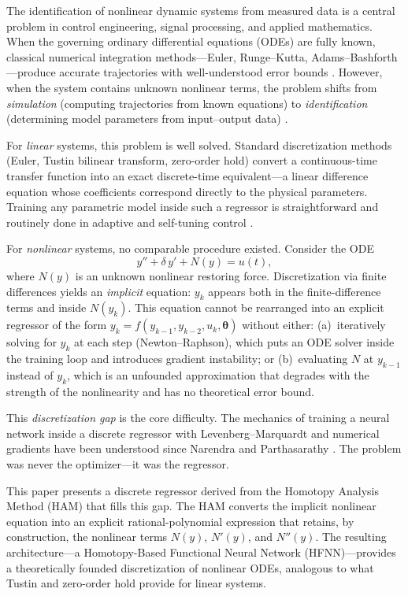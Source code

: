 \documentclass[preprint,12pt]{elsarticle}
\begin{document}
The identification of nonlinear dynamic systems from measured data is a central problem in control engineering, signal processing, and applied mathematics. When the governing ordinary differential equations (ODEs) are fully known, classical numerical integration methods---Euler, Runge--Kutta, Adams--Bashforth---produce accurate trajectories with well-understood error bounds \cite{butcher2016, hairer1993}. However, when the system contains unknown nonlinear terms, the problem shifts from \emph{simulation} (computing trajectories from known equations) to \emph{identification} (determining model parameters from input--output data) \cite{ljung1987}.

For \emph{linear} systems, this problem is well solved. Standard discretization methods (Euler, Tustin bilinear transform, zero-order hold) convert a continuous-time transfer function into an exact discrete-time equivalent---a linear difference equation whose coefficients correspond directly to the physical parameters. Training any parametric model inside such a regressor is straightforward and routinely done in adaptive and self-tuning control \cite{astrom1995, ljung1987}.

For \emph{nonlinear} systems, no comparable procedure existed. Consider the ODE
\begin{equation}
y'' + \delta\, y' + N(y) = u(t),
\label{eq:nonlinear_ode}
\end{equation}
where $N(y)$ is an unknown nonlinear restoring force. Discretization via finite differences yields an \emph{implicit} equation: $y_k$ appears both in the finite-difference terms and inside $N(y_k)$. This equation cannot be rearranged into an explicit regressor of the form $y_k = f(y_{k-1}, y_{k-2}, u_k, \boldsymbol{\theta})$ without either: (a)~iteratively solving for $y_k$ at each step (Newton--Raphson), which puts an ODE solver inside the training loop and introduces gradient instability; or (b)~evaluating $N$ at $y_{k-1}$ instead of $y_k$, which is an unfounded approximation that degrades with the strength of the nonlinearity and has no theoretical error bound.

This \emph{discretization gap} is the core difficulty. The mechanics of training a neural network inside a discrete regressor with Levenberg--Marquardt and numerical gradients have been understood since Narendra and Parthasarathy \cite{narendra1990}. The problem was never the optimizer---it was the regressor.

This paper presents a discrete regressor derived from the Homotopy Analysis Method (HAM) \cite{liao1992, liao2003, liao2012} that fills this gap. The HAM converts the implicit nonlinear equation into an explicit rational-polynomial expression that retains, by construction, the nonlinear terms $N(y)$, $N'(y)$, and $N''(y)$. The resulting architecture---a Homotopy-Based Functional Neural Network (HFNN)---provides a theoretically founded discretization of nonlinear ODEs, analogous to what Tustin and zero-order hold provide for linear systems.
\end{document}
